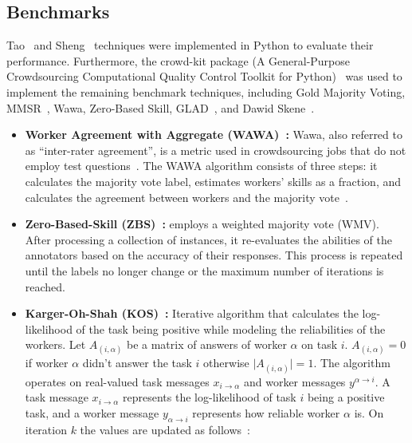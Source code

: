 \subsection{Benchmarks}
Tao~\cite{tao_Label_2020} and Sheng~\cite{sheng_Majority_2019} techniques were implemented in Python to evaluate their performance. Furthermore, the crowd-kit package (A General-Purpose Crowdsourcing Computational Quality Control Toolkit for Python)~\cite{ustalov_learning_2021} was used to implement the remaining benchmark techniques, including Gold Majority Voting, MMSR~\cite{ma_Adversarial_2020}, Wawa, Zero-Based Skill, GLAD~\cite{whitehill_Whose_2009}, and Dawid Skene~\cite{dawid_Maximum_1979}.
%
\begin{itemize}
    \item \textbf{Worker Agreement with Aggregate (WAWA)~\cite{crowdkit_webpage_documentation}:} Wawa, also referred to as ``inter-rater agreement'', is a metric used in crowdsourcing jobs that do not employ test questions~\cite{appen_wawa_2023}. The WAWA algorithm consists of three steps: it calculates the majority vote label, estimates workers' skills as a fraction, and calculates the agreement between workers and the majority vote~\cite{crowdkit_webpage_documentation}.
    \item \textbf{Zero-Based-Skill (ZBS)~\cite{crowdkit_webpage_documentation}:} employs a weighted majority vote (WMV). After processing a collection of instances, it re-evaluates the abilities of the annotators based on the accuracy of their responses. This process is repeated until the labels no longer change or the maximum number of iterations is reached.
    \item \textbf{Karger-Oh-Shah (KOS)~\cite{crowdkit_webpage_documentation}:} Iterative algorithm that calculates the log-likelihood of the task being positive while modeling the reliabilities of the workers. Let $A_{(i,\alpha)} $ be a matrix of answers of worker $\alpha $ on task $i $. $A_{(i,\alpha)} = 0 $ if worker $\alpha $ didn't answer the task $i $ otherwise $\vert A_{(i,\alpha)} \vert = 1 $. The algorithm operates on real-valued task messages $x_{i \rightarrow \alpha} $  and worker messages $y^{\alpha \rightarrow i} $. A task message $x_{i \rightarrow \alpha} $ represents the log-likelihood of task $i $ being a positive task, and a worker message $y_{\alpha \rightarrow i} $ represents how reliable worker $\alpha $ is. On iteration $k$ the values are updated as follows~\cite{crowdkit_webpage_documentation}:
    \begin{equation}

\end{equation}
\end{itemize}
